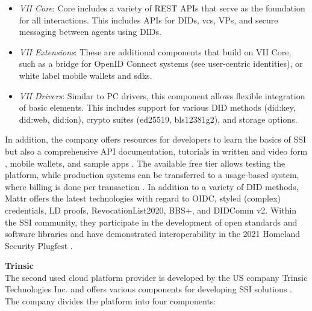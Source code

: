     \begin{itemize}
        \item \textit{VII Core}: Core includes a variety of REST APIs that serve as the foundation for all interactions. This includes APIs for \acp{DID}, \acp{vc}, \acp{VP}, and secure messaging between agents using \acp{DID}. \cite{Mattr_vii_2021}
        \item \textit{VII Extensions}: These are additional components that build on VII Core, such as a bridge for OpenID Connect systems (see user-centric identities), or white label mobile wallets and \acp{sdk}. \cite{Mattr_vii_2021-1}
        \item \textit{VII Drivers}: Similar to PC drivers, this component allows flexible integration of basic elements. This includes support for various \ac{DID} methods (did:key, did:web, did:ion), crypto suites (ed25519, bls12381g2)\cite{Mattr_vii_2021-2}, and storage options. \cite{Mattr_vii_2021-3}
    \end{itemize}
    
    In addition, the company offers resources for developers to learn the basics of \ac{SSI} \cite{Mattr_resources_2021} but also a comprehensive API documentation, tutorials in written and video form \cite{Mattr_Mattr_2021}, mobile wallets, and sample apps \cite{Mattr_Mattr_2021-1, Mattr_vii_2021}. The available free tier allows testing the platform, while production systems can be transferred to a usage-based system, where billing is done per transaction \cite{Mattr_Mattr_2021-3}. In addition to a variety of \ac{DID} methods, Mattr offers the latest technologies with regard to \ac{OIDC}, styled (complex) credentials, LD proofs, RevocationList2020, BBS+, and DIDComm v2. Within the \ac{SSI} community, they participate in the development of open standards \cite{Mattr_approach_2021, looker_bbs_2021} and software libraries \cite{Mattr_Mattr_2021-5} and have demonstrated interoperability in the 2021 Homeland Security Plugfest  \cite{homeland_security_interoperability_2021}.
    
    \textbf{Trinsic}\\
    The second used cloud platform provider is developed by the US company Trinsic Technologies Inc. and offers various components for developing \ac{SSI} solutions \cite{trinsic_trinsic_2021}. The company divides the platform into four components:
    
